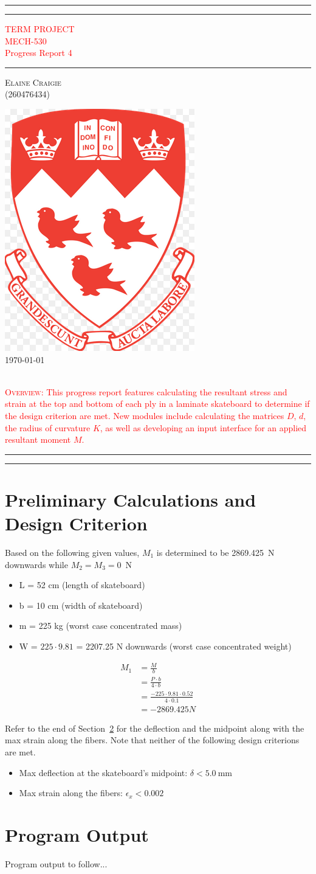 \documentclass{SelimArticle}
\newcommand*{\plogo}{\fbox{$\mathcal{PL}$}} %
\newcommand*{\titleAT}{\begingroup %
\newlength{\drop} %
\drop=0.1\textheight %

\rule{\textwidth}{1pt}\par %
\vspace{2pt}\vspace{-\baselineskip} %
\rule{\textwidth}{0.4pt}\par %

\vspace{\drop} %
\centering %
\textcolor{Red}{ %
{\Huge TERM PROJECT}\\[0.5\baselineskip] %
{\Large MECH-530}\\[0.75\baselineskip] %
{\Huge Progress Report 4}} %

\vspace{0.25\drop} %
\rule{0.3\textwidth}{0.4pt}\par %
\vspace{\drop} %

{\Large \textsc{Elaine Craigie} \\ \vspace{0.5cm} (260476434)}\par %

\vfill %
\includegraphics[scale = 0.45]{pic_mcgill}
\vspace{2.0cm}
{\Large \textsc{\\ \today}}\par %
\vspace{1.0cm}
{\raggedleft{}
\textcolor{Red}{
{\large \\ \textsc{Overview:} This progress report features calculating the resultant stress and strain at the top and bottom of each ply in a laminate skateboard to determine if the design criterion are met. New modules include calculating the matrices $D$, $d$, the radius of curvature $K$, as well as developing an input interface for an applied resultant moment $M$.}}}
\centering
\rule{\textwidth}{0.4pt}\par %
\vspace{2pt}\vspace{-\baselineskip} %
\rule{\textwidth}{1pt}\par %

\endgroup}
\begin{document}
\pagestyle{empty} %

\titleAT %

\printnomenclature[0.5in]
\newpage
{}
\setcounter{page}{1}
\section{Preliminary Calculations and Design Criterion}
Based on the following given values, $M_{1}$ is determined to be 2869.425~N downwards while $M_{2} = M_{3} = 0$~N
\begin{itemize}
\item L = 52 cm (length of skateboard)
\item b = 10 cm (width of skateboard)
\item m = 225 kg (worst case concentrated mass)
\item W = $225 \cdot 9.81$ = 2207.25 N downwards (worst case concentrated weight) 
\end{itemize}
 
\begin{align*}
M_{1} &= \frac{M}{b} \\
&= \frac{P \cdot b}{4 \cdot b} \\
&= \frac{-225 \cdot 9.81 \cdot 0.52}{4 \cdot 0.1} \\
&= -2869.425 N
\label{eq:appliedload}
\end{align*}

Refer to the end of Section~\ref{sec:programout} for the deflection and the midpoint along with the max strain along the fibers. Note that neither of the following design criterions are met.
\begin{itemize}
\item Max deflection at the skateboard's midpoint: $\delta < 5.0~\text{mm}$
\item Max strain along the fibers: $\epsilon_{x} < 0.002$ 
\end{itemize}

\section{Program Output}
\label{sec:programout}
Program output to follow...

\end{document}
